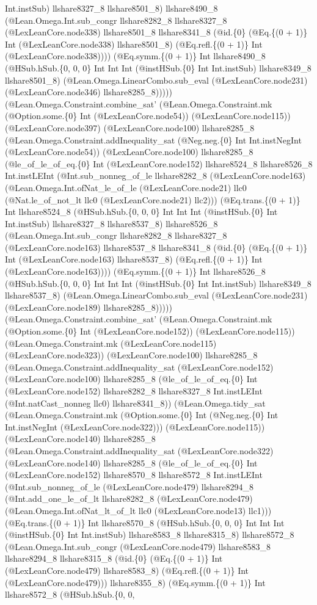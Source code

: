 \documentclass[11pt]{article}
\begin{document}
Int.instSub) llshare8327\_8 llshare8501\_8) llshare8490\_8 (@Lean.Omega.Int.sub\_congr llshare8282\_8 llshare8327\_8 (@LexLeanCore.node338) llshare8501\_8 llshare8341\_8 (@id.\{0\} (@Eq.\{(0 + 1)\} Int (@LexLeanCore.node338) llshare8501\_8) (@Eq.refl.\{(0 + 1)\} Int (@LexLeanCore.node338)))) (@Eq.symm.\{(0 + 1)\} Int llshare8490\_8 (@HSub.hSub.\{0, 0, 0\} Int Int Int (@instHSub.\{0\} Int Int.instSub) llshare8349\_8 llshare8501\_8) (@Lean.Omega.LinearCombo.sub\_eval (@LexLeanCore.node231) (@LexLeanCore.node346) llshare8285\_8))))) (@Lean.Omega.Constraint.combine\_sat' (@Lean.Omega.Constraint.mk (@Option.some.\{0\} Int (@LexLeanCore.node54)) (@LexLeanCore.node115)) (@LexLeanCore.node397) (@LexLeanCore.node100) llshare8285\_8 (@Lean.Omega.Constraint.addInequality\_sat (@Neg.neg.\{0\} Int Int.instNegInt (@LexLeanCore.node54)) (@LexLeanCore.node100) llshare8285\_8 (@le\_of\_le\_of\_eq.\{0\} Int (@LexLeanCore.node152) llshare8524\_8 llshare8526\_8 Int.instLEInt (@Int.sub\_nonneg\_of\_le llshare8282\_8 (@LexLeanCore.node163) (@Lean.Omega.Int.ofNat\_le\_of\_le (@LexLeanCore.node21) llc0 (@Nat.le\_of\_not\_lt llc0 (@LexLeanCore.node21) llc2))) (@Eq.trans.\{(0 + 1)\} Int llshare8524\_8 (@HSub.hSub.\{0, 0, 0\} Int Int Int (@instHSub.\{0\} Int Int.instSub) llshare8327\_8 llshare8537\_8) llshare8526\_8 (@Lean.Omega.Int.sub\_congr llshare8282\_8 llshare8327\_8 (@LexLeanCore.node163) llshare8537\_8 llshare8341\_8 (@id.\{0\} (@Eq.\{(0 + 1)\} Int (@LexLeanCore.node163) llshare8537\_8) (@Eq.refl.\{(0 + 1)\} Int (@LexLeanCore.node163)))) (@Eq.symm.\{(0 + 1)\} Int llshare8526\_8 (@HSub.hSub.\{0, 0, 0\} Int Int Int (@instHSub.\{0\} Int Int.instSub) llshare8349\_8 llshare8537\_8) (@Lean.Omega.LinearCombo.sub\_eval (@LexLeanCore.node231) (@LexLeanCore.node189) llshare8285\_8))))) (@Lean.Omega.Constraint.combine\_sat' (@Lean.Omega.Constraint.mk (@Option.some.\{0\} Int (@LexLeanCore.node152)) (@LexLeanCore.node115)) (@Lean.Omega.Constraint.mk (@LexLeanCore.node115) (@LexLeanCore.node323)) (@LexLeanCore.node100) llshare8285\_8 (@Lean.Omega.Constraint.addInequality\_sat (@LexLeanCore.node152) (@LexLeanCore.node100) llshare8285\_8 (@le\_of\_le\_of\_eq.\{0\} Int (@LexLeanCore.node152) llshare8282\_8 llshare8327\_8 Int.instLEInt (@Int.natCast\_nonneg llc0) llshare8341\_8)) (@Lean.Omega.tidy\_sat (@Lean.Omega.Constraint.mk (@Option.some.\{0\} Int (@Neg.neg.\{0\} Int Int.instNegInt (@LexLeanCore.node322))) (@LexLeanCore.node115)) (@LexLeanCore.node140) llshare8285\_8 (@Lean.Omega.Constraint.addInequality\_sat (@LexLeanCore.node322) (@LexLeanCore.node140) llshare8285\_8 (@le\_of\_le\_of\_eq.\{0\} Int (@LexLeanCore.node152) llshare8570\_8 llshare8572\_8 Int.instLEInt (@Int.sub\_nonneg\_of\_le (@LexLeanCore.node479) llshare8294\_8 (@Int.add\_one\_le\_of\_lt llshare8282\_8 (@LexLeanCore.node479) (@Lean.Omega.Int.ofNat\_lt\_of\_lt llc0 (@LexLeanCore.node13) llc1))) (@Eq.trans.\{(0 + 1)\} Int llshare8570\_8 (@HSub.hSub.\{0, 0, 0\} Int Int Int (@instHSub.\{0\} Int Int.instSub) llshare8583\_8 llshare8315\_8) llshare8572\_8 (@Lean.Omega.Int.sub\_congr (@LexLeanCore.node479) llshare8583\_8 llshare8294\_8 llshare8315\_8 (@id.\{0\} (@Eq.\{(0 + 1)\} Int (@LexLeanCore.node479) llshare8583\_8) (@Eq.refl.\{(0 + 1)\} Int (@LexLeanCore.node479))) llshare8355\_8) (@Eq.symm.\{(0 + 1)\} Int llshare8572\_8 (@HSub.hSub.\{0, 0, 
\end{document}
